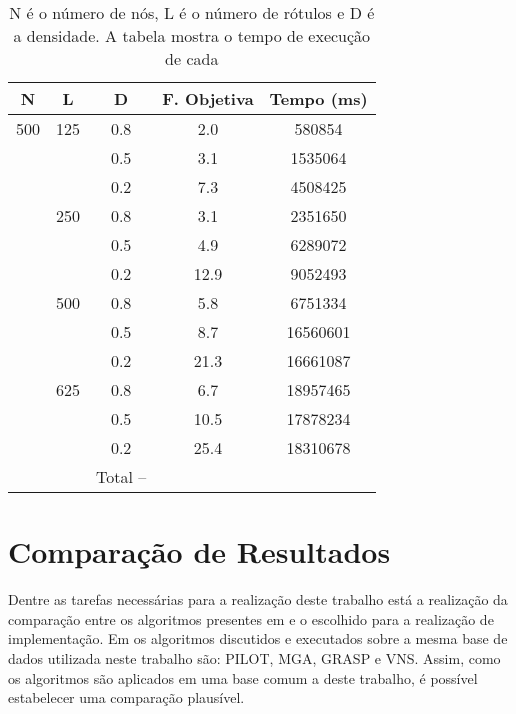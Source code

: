 \documentclass{sig-alternate-05-2015}
\begin{document}
\begin{table}[!h]
        \begin{tabular}{ccccc}
                \hline \rule[-2ex]{0pt}{5.5ex} N & L & D  & F. Objetiva & Tempo (ms) \\ 
                \hline \rule[-2ex]{0pt}{5.5ex} 500 & 125 & 0.8 & 2.0 & 580854 \\ 
                \hline \rule[-2ex]{0pt}{5.5ex}  &  & 0.5 & 3.1 & 1535064 \\ 
                \hline \rule[-2ex]{0pt}{5.5ex}  &  & 0.2 & 7.3 & 4508425 \\ 
                \hline \rule[-2ex]{0pt}{5.5ex}  & 250 & 0.8 & 3.1 & 2351650 \\ 
                \hline \rule[-2ex]{0pt}{5.5ex}  &  & 0.5 & 4.9 & 6289072 \\ 
                \hline \rule[-2ex]{0pt}{5.5ex}  &  & 0.2 & 12.9 & 9052493 \\ 
                \hline \rule[-2ex]{0pt}{5.5ex}  & 500 & 0.8 & 5.8 & 6751334 \\ 
                \hline \rule[-2ex]{0pt}{5.5ex}  &  & 0.5 & 8.7 & 16560601 \\ 
                \hline \rule[-2ex]{0pt}{5.5ex}  &  & 0.2 & 21.3 & 16661087 \\ 
                \hline \rule[-2ex]{0pt}{5.5ex}  & 625 & 0.8 & 6.7 & 18957465 \\ 
                \hline \rule[-2ex]{0pt}{5.5ex}  &  & 0.5 & 10.5 & 17878234 \\ 
                \hline \rule[-2ex]{0pt}{5.5ex}  &  & 0.2 & 25.4 & 18310678 \\ 
                \hline \rule[-2ex]{0pt}{5.5ex}  &  & Total -- &  &  \\ 
                \hline 
        \end{tabular}  
        \caption{N é o número de nós, L é o número de rótulos e D é a densidade.  A tabela mostra o tempo de execução de cada}
        \label{tab4}
\end{table}
\section{Comparação de Resultados} \label{sec5}
Dentre as tarefas necessárias para a realização deste trabalho está a realização da comparação entre os algoritmos presentes em \cite{consoli2009greedy} 
e o escolhido para a realização de implementação. Em \cite{consoli2009greedy} os algoritmos discutidos e executados sobre a mesma base de dados utilizada neste 
trabalho são: PILOT, MGA, GRASP e VNS. Assim, como os algoritmos são aplicados em uma base comum a deste trabalho, é possível estabelecer uma comparação plausível. 
\end{document}
